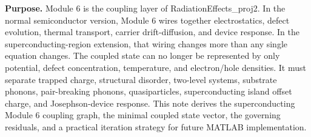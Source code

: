 \documentclass[11pt]{article}
\begin{document}

\begin{overviewbox}
\textbf{Purpose.} Module 6 is the coupling layer of RadiationEffects\_proj2. In the normal semiconductor version, Module 6 wires together electrostatics, defect evolution, thermal transport, carrier drift-diffusion, and device response. In the superconducting-region extension, that wiring changes more than any single equation changes. The coupled state can no longer be represented by only potential, defect concentration, temperature, and electron/hole densities. It must separate trapped charge, structural disorder, two-level systems, substrate phonons, pair-breaking phonons, quasiparticles, superconducting island offset charge, and Josephson-device response. This note derives the superconducting Module 6 coupling graph, the minimal coupled state vector, the governing residuals, and a practical iteration strategy for future MATLAB implementation.
\end{overviewbox}

\ProjectTOC
\end{document}

